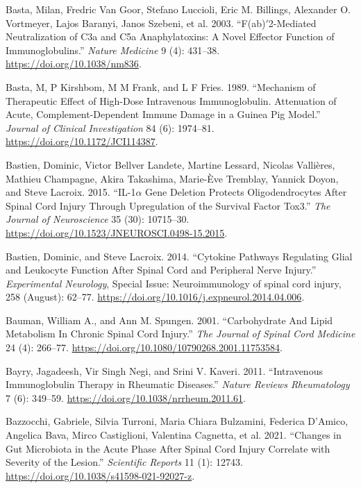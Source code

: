 \documentclass[9pt,lineno]{elife}
\newlength{\cslhangindent}
\newlength{\cslentryspacingunit} %
\newenvironment{CSLReferences}[2] %
 {%
  \setlength{\parindent}{0pt}
  \ifodd #1
  \let\oldpar\par
  \def\par{\hangindent=\cslhangindent\oldpar}
  \fi
  \setlength{\parskip}{#2\cslentryspacingunit}
 }%
 {}
\begin{document}
\begin{CSLReferences}{1}{0}
\leavevmode{}%
Basta, Milan, Fredric Van Goor, Stefano Luccioli, Eric M. Billings, Alexander O. Vortmeyer, Lajos Baranyi, Janos Szebeni, et al. 2003. {``F(ab){\({'}\)}2-Mediated Neutralization of {C3a} and {C5a} Anaphylatoxins: A Novel Effector Function of Immunoglobulins.''} \emph{Nature Medicine} 9 (4): 431--38. \url{https://doi.org/10.1038/nm836}.

\leavevmode{}%
Basta, M, P Kirshbom, M M Frank, and L F Fries. 1989. {``Mechanism of Therapeutic Effect of High-Dose Intravenous Immunoglobulin. {Attenuation} of Acute, Complement-Dependent Immune Damage in a Guinea Pig Model.''} \emph{Journal of Clinical Investigation} 84 (6): 1974--81. \url{https://doi.org/10.1172/JCI114387}.

\leavevmode{}%
Bastien, Dominic, Victor Bellver Landete, Martine Lessard, Nicolas Vallières, Mathieu Champagne, Akira Takashima, Marie-Ève Tremblay, Yannick Doyon, and Steve Lacroix. 2015. {``{IL-1\(\alpha\) Gene Deletion Protects Oligodendrocytes} After {Spinal Cord Injury} Through {Upregulation} of the {Survival Factor Tox3}.''} \emph{The Journal of Neuroscience} 35 (30): 10715--30. \url{https://doi.org/10.1523/JNEUROSCI.0498-15.2015}.

\leavevmode{}%
Bastien, Dominic, and Steve Lacroix. 2014. {``Cytokine Pathways Regulating Glial and Leukocyte Function After Spinal Cord and Peripheral Nerve Injury.''} \emph{Experimental Neurology}, Special {Issue}: {Neuroimmunology} of spinal cord injury, 258 (August): 62--77. \url{https://doi.org/10.1016/j.expneurol.2014.04.006}.

\leavevmode{}%
Bauman, William A., and Ann M. Spungen. 2001. {``Carbohydrate {And Lipid Metabolism In Chronic Spinal Cord Injury}.''} \emph{The Journal of Spinal Cord Medicine} 24 (4): 266--77. \url{https://doi.org/10.1080/10790268.2001.11753584}.

\leavevmode{}%
Bayry, Jagadeesh, Vir Singh Negi, and Srini V. Kaveri. 2011. {``Intravenous Immunoglobulin Therapy in Rheumatic Diseases.''} \emph{Nature Reviews Rheumatology} 7 (6): 349--59. \url{https://doi.org/10.1038/nrrheum.2011.61}.

\leavevmode{}%
Bazzocchi, Gabriele, Silvia Turroni, Maria Chiara Bulzamini, Federica D'Amico, Angelica Bava, Mirco Castiglioni, Valentina Cagnetta, et al. 2021. {``Changes in Gut Microbiota in the Acute Phase After Spinal Cord Injury Correlate with Severity of the Lesion.''} \emph{Scientific Reports} 11 (1): 12743. \url{https://doi.org/10.1038/s41598-021-92027-z}.


\end{CSLReferences}
\end{document}
